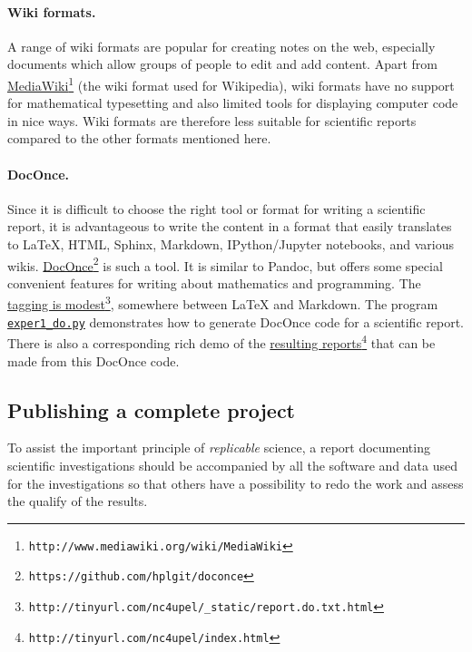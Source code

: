 \documentclass[graybox,sectrefs,envcountresetchap,open=right,final]{svmonodo}
\begin{document}
\paragraph{Wiki formats.}
A range of wiki formats are popular for creating notes on the web,
especially documents which allow groups of people to edit and add
content. Apart from \href{{http://www.mediawiki.org/wiki/MediaWiki}}{MediaWiki}\footnote{\texttt{http://www.mediawiki.org/wiki/MediaWiki}} (the wiki format used for
Wikipedia), wiki formats have no support for mathematical typesetting
and also limited tools for displaying computer code in nice ways.
Wiki formats are therefore less suitable for scientific reports compared
to the other formats mentioned here.


\paragraph{DocOnce.}
Since it is difficult to choose the right tool or format for writing a
scientific report, it is advantageous to write the content in a format
that easily translates to {\LaTeX}, HTML, Sphinx, Markdown,
IPython/Jupyter notebooks, and various wikis. \href{{https://github.com/hplgit/doconce}}{DocOnce}\footnote{\texttt{https://github.com/hplgit/doconce}} is such a tool. It is similar to
Pandoc, but offers some special convenient features for writing about
mathematics and programming.  The \href{{http://tinyurl.com/nc4upel/_static/report.do.txt.html}}{tagging is modest}\footnote{\texttt{http://tinyurl.com/nc4upel/\_static/report.do.txt.html}}, somewhere between
{\LaTeX} and Markdown.  The program \href{{http://tinyurl.com/p96acy2/exper1_do.py}}{\nolinkurl{exper1_do.py}} demonstrates how
to generate DocOnce code for a scientific report.
There is also a corresponding rich demo of the \href{{http://tinyurl.com/nc4upel/index.html}}{resulting reports}\footnote{\texttt{http://tinyurl.com/nc4upel/index.html}} that can be made from
this DocOnce code.



\subsection{Publishing a complete project}
\label{softeng1:exper:github}


To assist the important principle of \emph{replicable} science,
a report documenting scientific investigations should be accompanied by
all the software and data used for the investigations so that others
have a possibility to redo the work and assess the qualify of the results.
\end{document}
